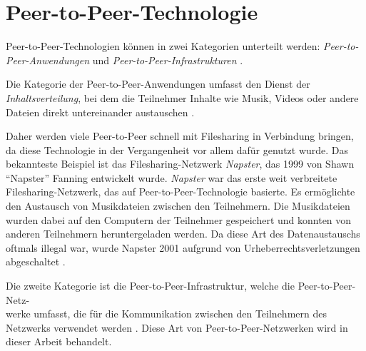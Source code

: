 \section{Peer-to-Peer-Technologie}
\label{subsec:peer_to_peer_technologie}


Peer-to-Peer-Technologien können in zwei Kategorien unterteilt werden: \textit{Peer-to-Peer-Anwendungen} und \textit{Peer-to-Peer-Infrastrukturen} \parencite[S. 730]{Khatibi_StructuredUnstructuredP2P}. 

Die Kategorie der Peer-to-Peer-Anwendungen umfasst den Dienst der \textit{Inhaltsverteilung}, bei dem die Teilnehmer Inhalte wie Musik, Videos oder andere Dateien direkt untereinander austauschen \Parencite[730-731]{Khatibi_StructuredUnstructuredP2P}. 

Daher werden viele Peer-to-Peer schnell mit Filesharing in Verbindung bringen, da diese Technologie in der Vergangenheit vor allem dafür genutzt wurde. Das bekannteste Beispiel ist das Filesharing-Netzwerk \textit{Napster}, das 1999 von Shawn \enquote{Napster} Fanning entwickelt wurde. \textit{Napster} war das erste weit verbreitete Filesharing-Netzwerk, das auf Peer-to-Peer-Technologie basierte. Es ermöglichte den Austausch von Musikdateien zwischen den Teilnehmern. Die Musikdateien wurden dabei auf den Computern der Teilnehmer gespeichert und konnten von anderen Teilnehmern heruntergeladen werden. Da diese Art des Datenaustauschs oftmals illegal war, wurde Napster 2001 aufgrund von Urheberrechtsverletzungen abgeschaltet \parencite[S. 55-57]{Mahlmann_P2PNetzwerke}.

Die zweite Kategorie ist die Peer-to-Peer-Infrastruktur, welche die Peer-to-Peer-Netz-\\werke umfasst, die für die Kommunikation zwischen den Teilnehmern des Netzwerks verwendet werden \parencite[S. 730-731]{Khatibi_StructuredUnstructuredP2P}. Diese Art von Peer-to-Peer-Netzwerken wird in dieser Arbeit behandelt.


